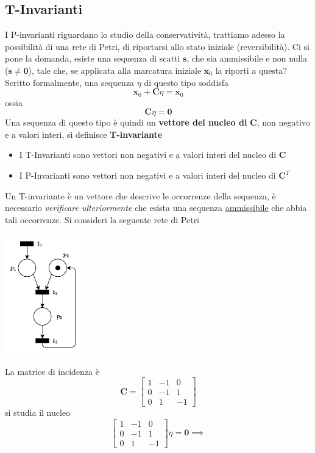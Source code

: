 \documentclass[10pt, letterpaper]{report}
\begin{document}
\subsection{T-Invarianti}
I P-invarianti riguardano lo studio della conservatività, trattiamo adesso la possibilità di una rete di Petri, di riportarsi allo stato iniziale (reversibilità). Ci si pone la domanda, esiste una sequenza di scatti $\mathbf s$, che sia ammissibile e non nulla ($\mathbf s \ne \mathbf 0$), tale che, se applicata alla marcatura iniziale $\mathbf x_0$ la riporti a questa?
\acc 
Scritto formalmente, una sequenza $\eta $ di questo tipo soddisfa 
$$ \mathbf x_0+\mathbf C\eta = \mathbf x_0$$
ossia 
$$\mathbf C\eta =\mathbf 0$$ 
Una sequenza di questo tipo è quindi un \textbf{vettore del nucleo di }$\mathbf C$, non negativo  e a valori interi, si definisce \textbf{T-invariante}\begin{itemize}
    \item I T-Invarianti sono vettori  non negativi e a valori interi del nucleo di $\mathbf C$
    \item I P-Invarianti sono vettori  non negativi e a valori interi del nucleo di $\mathbf C^T$
\end{itemize}
Un T-invariante è un vettore che descrive le occorrenze della sequenza, è necessario \textit{verificare ulteriormente} che esista una sequenza \underline{ammissibile} che abbia tali occorrenze.
\acc Si consideri la seguente rete di Petri 
\begin{center}
    \includegraphics[width=0.25\textwidth]{images/AlberoIll.drawio.pdf}
\end{center}
La matrice di incidenza è 
$$\mathbf C = \begin{bmatrix}
  1 & -1 & 0\\ 
  0 & -1 & 1 \\ 
  0 & 1 & -1
\end{bmatrix}$$
si studia il nucleo 
$$ \begin{bmatrix}
    1 & -1 & 0\\ 
    0 & -1 & 1 \\ 
    0 & 1 & -1
  \end{bmatrix}\eta = \mathbf 0 \implies 
  $$
\end{document}
